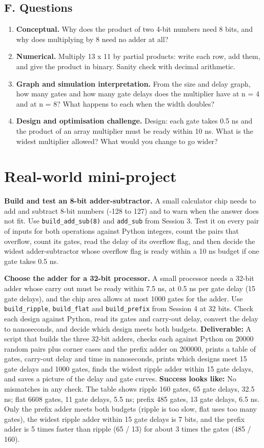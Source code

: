 \documentclass[11pt,a4paper]{article}
\begin{document}
\subsection*{F. Questions}
\begin{enumerate}[nosep]
\item \textbf{Conceptual.} Why does the product of two 4-bit numbers need 8 bits, and why does multiplying by 8 need no adder at all?
\item \textbf{Numerical.} Multiply 13 x 11 by partial products: write each row, add them, and give the product in binary. Sanity check with decimal arithmetic.
\item \textbf{Graph and simulation interpretation.} From the size and delay graph, how many gates and how many gate delays does the multiplier have at n = 4 and at n = 8? What happens to each when the width doubles?
\item \textbf{Design and optimisation challenge.} Design: each gate takes 0.5 ns and the product of an array multiplier must be ready within 10 ns. What is the widest multiplier allowed? What would you change to go wider?
\end{enumerate}

\section{Real-world mini-project}
\textbf{Build and test an 8-bit adder-subtractor.} A small calculator chip needs to add and subtract 8-bit numbers (-128 to 127) and to warn when the answer does not fit. Use \texttt{build\_add\_sub(8)} and \texttt{add\_sub} from Session 3. Test it on every pair of inputs for both operations against Python integers, count the pairs that overflow, count its gates, read the delay of its overflow flag, and then decide the widest adder-subtractor whose overflow flag is ready within a 10 ns budget if one gate takes 0.5 ns.

\textbf{Choose the adder for a 32-bit processor.} A small processor needs a 32-bit adder whose carry out must be ready within 7.5 ns, at 0.5 ns per gate delay (15 gate delays), and the chip area allows at most 1000 gates for the adder. Use \texttt{build\_ripple}, \texttt{build\_flat} and \texttt{build\_prefix} from Session 4 at 32 bits. Check each design against Python, read its gates and carry-out delay, convert the delay to nanoseconds, and decide which design meets both budgets. \textbf{Deliverable:} A script that builds the three 32-bit adders, checks each against Python on 20000 random pairs plus corner cases and the prefix adder on 200000, prints a table of gates, carry-out delay and time in nanoseconds, prints which designs meet 15 gate delays and 1000 gates, finds the widest ripple adder within 15 gate delays, and saves a picture of the delay and gate curves. \textbf{Success looks like:} No mismatches in any check. The table shows ripple 160 gates, 65 gate delays, 32.5 ns; flat 6608 gates, 11 gate delays, 5.5 ns; prefix 485 gates, 13 gate delays, 6.5 ns. Only the prefix adder meets both budgets (ripple is too slow, flat uses too many gates), the widest ripple adder within 15 gate delays is 7 bits, and the prefix adder is 5 times faster than ripple (65 / 13) for about 3 times the gates (485 / 160).
\end{document}
